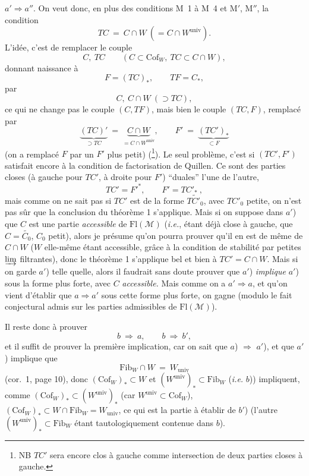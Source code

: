 \documentclass[11pt]{article}
\newcommand{\printedpage}[1]{\marginpar{\footnotesize p.~#1}}
\newcommand{\msp}[1]{\marginpar{\footnotesize [#1]}}
\newcommand{\Cof}{\mathrm{Cof}}
\newcommand{\Fib}{\mathrm{Fib}}
\newcommand{\Fl}{\mathrm{Fl}}
\newcommand{\univ}{\mathrm{univ}}
\begin{document}
$a' \Longrightarrow a''$. On veut donc, en plus des conditions M~1 à M~4 et M$'$, M$''$, la condition
\[ TC \ =\ C \cap W\ (= C \cap W^{\univ}). \]
L'idée, c'est de remplacer le couple
\msp{page 18}
\[ C,\ TC \qquad (C \subset \Cof_W,\ TC \subset C \cap W), \]
donnant naissance à
\[ F = (TC)_*, \qquad TF = C_*, \]
par
\[ C,\ C \cap W\ (\supset TC), \]
\printedpage{11}
ce qui ne change pas le couple $(C, TF)$, mais bien le couple $(TC, F)$, remplacé par
\[ \underbrace{(TC)'}_{\supset TC} \ =\ \underbrace{C \cap W}_{= C\cap W^{\univ}}, \qquad F' \ =\ \underbrace{(TC')_*}_{\subset F} \]
(on a remplacé $F$ par un $F'$ plus petit) (\footnote[14]{NB $TC'$ sera encore clos à gauche comme intersection de deux parties closes à gauche.}). Le seul problème, c'est si $(TC', F')$ satisfait encore à la condition de factorisation de Quillen. Ce sont des parties closes (à gauche pour $TC'$, à droite pour $F'$) “duales” l'une de l'autre,
\[ TC' = F'^*, \qquad F' = TC'_* \ , \]
mais comme on ne sait pas si $TC'$ est de la forme $\widetilde{TC'_0}$, avec $TC'_0$ petite, on n'est pas sûr que la conclusion du théorème 1 s'applique. Mais si on suppose dans $a'$) que $C$ est une partie \textit{accessible} de $\Fl(\mathcal{M})$ (\textit{i.e.}, étant déjà close à gauche, que $C = \widetilde{C_0}$, $C_0$ petit),
\msp{page 19}
alors je présume qu'on pourra prouver qu'il en est de même de $C \cap W$ ($W$ elle-même étant accessible, grâce à la condition de stabilité par petites $\varinjlim$ filtrantes), donc le théorème 1 s'applique bel et bien à $TC' = C \cap W$. Mais si on garde $a'$) telle quelle, alors il faudrait sans doute prouver que $a'$) \textit{implique} $a'$) sous la forme plus forte, avec $C$ \textit{accessible.} Mais comme on a $a' \Longrightarrow a$, et qu'on vient d'établir que $a \Longrightarrow a'$ sous cette forme plus forte, on gagne (modulo le fait conjectural admis sur les parties admissibles de $\Fl(\mathcal{M})$).

Il reste donc à prouver
\[ b \ \Longrightarrow\ a, \qquad b \ \Longrightarrow\ b', \]
et il suffit de prouver la première implication, car on sait que $a$) $\Longrightarrow$ $a'$), et que $a'$) implique que
\[ \Fib_W \cap W \ =\ W_{\univ} \]
(cor.~1, page 10), donc $(\Cof_W)_* \subset W$ et $(W^{\univ})_* \subset \Fib_W$ (\textit{i.e.} $b$)) impliquent, comme $(\Cof_W)_* \subset (W^{\univ})_*$ (car $W^{\univ} \subset \Cof_W$), $(\Cof_W)_* \subset W \cap \Fib_W = W_{\univ}$, ce qui est la partie à établir de $b'$) (l'autre $(W^{\univ})_* \subset \Fib_W$ étant tautologiquement contenue dans $b$).
\end{document}
